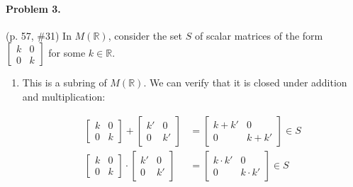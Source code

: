 \documentclass[12pt]{article}
\begin{document}
\paragraph{Problem 3.} (p. 57, \#31)
In $M(\mathbb R)$, consider the set $S$ of scalar matrices of the form $\begin{bmatrix}k & 0 \\ 0 & k\end{bmatrix}$ for some $k \in \mathbb R$.
\begin{enumerate}
    \item[a.] This is a subring of $M(\mathbb R)$. We can verify that it is closed under addition and multiplication: {
        \begin{align*}
            \begin{bmatrix}
                k & 0 \\ 0 & k
            \end{bmatrix} +
            \begin{bmatrix}
                k' & 0 \\ 0 & k'
            \end{bmatrix} &= 
            \begin{bmatrix}
                k + k' & 0 \\ 0 & k + k'
            \end{bmatrix} \in S \\
            \begin{bmatrix}
                k & 0 \\ 0 & k
            \end{bmatrix}
            \cdot \begin{bmatrix}
                k' & 0 \\ 0 & k'
            \end{bmatrix} &=
            \begin{bmatrix}
                k \cdot k' & 0 \\
                0 & k \cdot k'
            \end{bmatrix} \in S
        \end{align*}
        
}
\end{enumerate}
\end{document}
